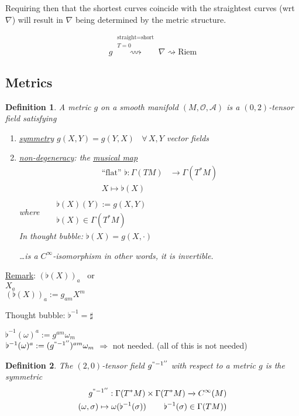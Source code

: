 \documentclass[10pt, twoside]{amsart}
\newtheorem{definition}{Definition}
\begin{document}
\begin{multicols*}{2}
Requiring then that the shortest curves coincide with the straightest curves (wrt $\nabla$) will result in $\nabla$ being determined by the metric structure.  

\[
g  \overset{ \substack{ \text{straight} = \text{short} \\ T =0 }  }{ \rightsquigarrow }  \nabla \rightsquigarrow \text{Riem}
\]


\subsection{Metrics}

\begin{definition}
  A metric $g$ on a smooth manifold $(M,\mathcal{O}, \mathcal{A})$ is a $(0,2)$-tensor field satisfying
\begin{enumerate}
  \item[(i)] \underline{symmetry} $g(X,Y) = g(Y,X)$ \, $\forall \, X, Y$ vector fields
\item[(ii)] \underline{non-degeneracy}: the \underline{musical map} 
\[
\begin{aligned}
  \text{``flat''} \, \,  \flat : \Gamma(TM) & \to \Gamma(T^*M) \\ 
  X \mapsto \flat(X)
\end{aligned}
\]
\emph{where} \quad \,  $\begin{aligned} & \quad \quad \\ 
  & \flat(X)(Y):= g(X,Y) \\
  & \flat(X) \in \Gamma(T^*M) \end{aligned}$ \\
In thought bubble: $\flat(X) = g(X,\cdot)$

\dots is a $C^{\infty}$-isomorphism in other words, it is invertible.  


\end{enumerate}
\end{definition}

\underline{Remark}: $(\flat(X))_a$ \quad \, or \\
$X_a$ \\
$(\flat(X))_a := g_{am} X^m$

Thought bubble: $\flat^{-1} = \sharp$

$\flat^{-1}(\omega)^a := g^{am}\omega_m$ \\
$\flat^{-1}(\omega)^a := (g^{``-1''})^{am}\omega_m$
$\Longrightarrow $ not needed.  (all of this is not needed)

\begin{definition}
  The $(2,0)$-tensor field $g^{``-1''}$ with respect to a metric $g$ is the symmetric
\[
\begin{aligned}
  g^{``-1''} : \Gamma(T^*M) \times \Gamma(T^*M) \xrightarrow{ ~ } C^{\infty}(M) \\
  (\omega, \sigma) \mapsto \omega( \flat^{-1}(\sigma)) \quad \quad \, \flat^{-1}(\sigma) \in \Gamma(TM))
\end{aligned}
\]


\end{definition}
\end{multicols*}
\end{document}
